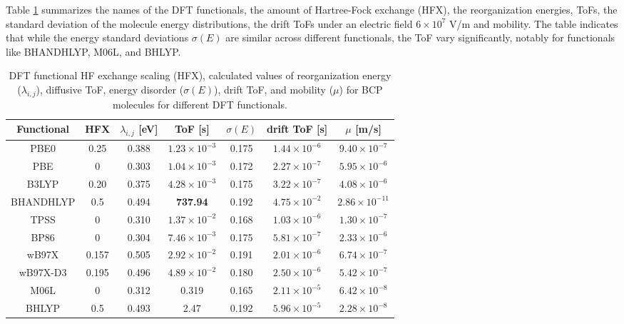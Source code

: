 \documentclass[letterpaper,12pt]{article}
\begin{document}
Table \ref{tab:para} summarizes the names of the DFT functionals, the amount of Hartree-Fock exchange (HFX), the reorganization energies, ToFs, the standard deviation of the molecule energy distributions, the drift ToFs under an electric field $6 \times 10^7$ V/m and mobility.
The table indicates that while the energy standard deviations $\sigma(E)$ are similar across different functionals, the ToF vary significantly, notably for functionals like BHANDHLYP, M06L, and BHLYP.

\begin{table}[H]
    \centering
    \begin{tabular}{c c c c c c c}
    \hline
        Functional & HFX & $\lambda_{i,j}$ [eV] & ToF [s] & $\sigma(E)$ & drift ToF [s] & $\mu$ [m/s] \\ 
        \hline
        PBE0 & 0.25 & 0.388 & $1.23\times 10^{-3}$ & 0.175 & $1.44 \times 10^{-6}$ & $9.40\times 10^{-7}$ \\
        PBE & 0 & 0.303 & $1.04\times 10^{-3}$ & 0.172 & $2.27 \times 10^{-7}$ & $5.95 \times 10^{-6}$ \\ 
        B3LYP & 0.20 & 0.375 & $4.28\times 10^{-3}$ & 0.175  & $3.22\times 10^{-7}$ & $4.08 \times 10^{-6}$ \\
        BHANDHLYP & 0.5 & 0.494 & \textbf{737.94} & 0.192  & $4.75\times 10^{-2}$ & $2.86\times 10^{-11}$ \\
        TPSS & 0 & 0.310 & $1.37\times 10^{-2}$ & 0.168  & $1.03 \times 10^{-6}$ & $1.30\times 10^{-7}$ \\
        BP86 & 0 & 0.304 & $7.46\times 10^{-3}$ & 0.175  & $5.81 \times 10^{-7}$ & $2.33\times 10^{-6}$ \\
        wB97X & 0.157 & 0.505 & $2.92\times 10^{-2}$ & 0.191  & $2.01\times 10^{-6}$  & $6.74\times 10^{-7}$ \\
        wB97X-D3 & 0.195 & 0.496 & $4.89\times 10^{-2}$ & 0.180  & $2.50 \times 10^{-6}$ & $5.42 \times 10^{-7}$ \\
        M06L & 0 & 0.312 & 0.319 & 0.165 & $2.11 \times 10^{-5}$ & $6.42 \times 10^{-8}$ \\
        BHLYP & 0.5 & 0.493 & 2.47 & 0.192  & $5.96 \times 10^{-5}$ & $ 2.28\times 10^{-8}$  \\
    \hline
    \end{tabular}
    \caption{DFT functional HF exchange scaling (HFX), calculated values of reorganization energy ($\lambda_{i,j}$), diffusive ToF, energy disorder ($\sigma(E)$), drift ToF, and mobility ($\mu$) for BCP molecules for different DFT functionals.}
    \label{tab:para}
\end{table}
\end{document}
